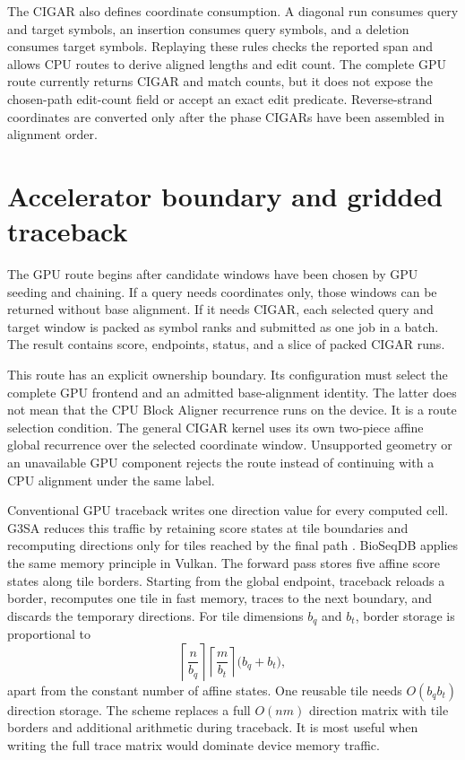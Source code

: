 The CIGAR also defines coordinate consumption. A diagonal run consumes query
and target symbols, an insertion consumes query symbols, and a deletion
consumes target symbols. Replaying these rules checks the reported span and
allows CPU routes to derive aligned lengths and edit count. The complete GPU
route currently returns CIGAR and match counts, but it does not expose the
chosen-path edit-count field or accept an exact edit predicate. Reverse-strand
coordinates are converted only after the phase CIGARs have been assembled in
alignment order.

\section{Accelerator boundary and gridded traceback}
\label{sec:final-alignment-gpu}

The GPU route begins after candidate windows have been chosen by GPU seeding
and chaining. If a query needs coordinates only, those windows can be returned
without base alignment. If it needs CIGAR, each selected query and target
window is packed as symbol ranks and submitted as one job in a batch. The
result contains score, endpoints, status, and a slice of packed CIGAR runs.

This route has an explicit ownership boundary. Its configuration must select
the complete GPU frontend and an admitted base-alignment identity. The latter
does not mean that the CPU Block Aligner recurrence runs on the device. It is
a route selection condition. The general CIGAR kernel uses its own two-piece
affine global recurrence over the selected coordinate window. Unsupported
geometry or an unavailable GPU component rejects the route instead of
continuing with a CPU alignment under the same label.

Conventional GPU traceback writes one direction value for every computed
cell. G3SA reduces this traffic by retaining score states at tile boundaries
and recomputing directions only for tiles reached by the final path
\cite{g3sa_paper}. BioSeqDB applies the same memory principle in Vulkan. The
forward pass stores five affine score states along tile borders. Starting from
the global endpoint, traceback reloads a border, recomputes one tile in fast
memory, traces to the next boundary, and discards the temporary directions.
For tile dimensions \(b_q\) and \(b_t\), border storage is proportional to
\[
  \left\lceil\frac{n}{b_q}\right\rceil
  \left\lceil\frac{m}{b_t}\right\rceil
  \bigl(b_q+b_t\bigr),
\]
apart from the constant number of affine states. One reusable tile needs
\(O(b_qb_t)\) direction storage. The scheme replaces a full \(O(nm)\)
direction matrix with tile borders and additional arithmetic during
traceback. It is most useful when writing the full trace matrix would dominate
device memory traffic.

